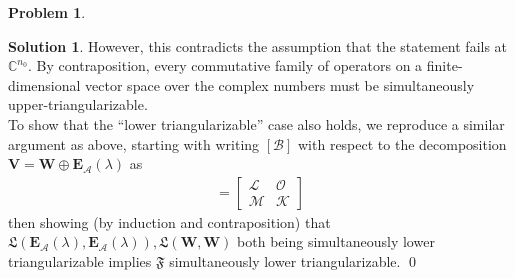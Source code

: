 \documentclass{article}
\theoremstyle{definition}
\newtheorem*{prob*}{Problem}
\newtheorem*{sln*}{Solution}
\newcommand{\V}{\mathbf{V}}
\newcommand{\W}{\mathbf{W}}
\newcommand{\A}{\mathcal{A}}
\newcommand{\B}{\mathcal{B}}
\newcommand{\lag}{\mathcal{L}}
\newcommand{\M}{\mathcal{M}}
\newcommand{\K}{\mathcal{K}}
\newcommand{\FF}{\mathfrak{F}}
\newcommand{\LL}{\mathfrak{L}}
\begin{document}
\begin{prob*}
\begin{sln*}
	However, this contradicts the assumption that the statement fails at $\mathbb{C}^{n_0}$. By contraposition, every commutative family of operators on a finite-dimensional vector space over the complex numbers must be simultaneously upper-triangularizable.\\
	
	 To show that the ``lower triangularizable'' case also holds, we reproduce a similar argument as above, starting with writing $[\B]$ with respect to the decomposition $\V = \W \oplus \textbf{E}_\A(\lambda) $ as 
	 \begin{align*}
	 [\B] = \begin{bmatrix}
	 \lag & \mathcal{O}\\
	 \M & \K
	 \end{bmatrix}
	 \end{align*}
	then showing (by induction and contraposition) that $\LL(\textbf{E}_\A(\lambda),\textbf{E}_\A(\lambda)), \LL(\W,\W)$ both being simultaneously lower triangularizable implies $\FF$ simultaneously lower triangularizable.  \qed
	\end{sln*}
	
	

\end{prob*}






\newpage
\end{document}
